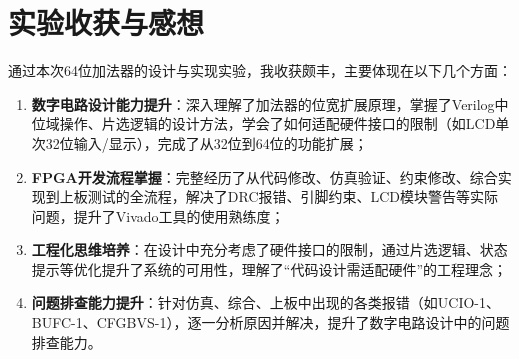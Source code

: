 \documentclass[12pt,a4paper,UTF8]{ctexart}
\begin{document}
\section{实验收获与感想}
通过本次64位加法器的设计与实现实验，我收获颇丰，主要体现在以下几个方面：
\begin{enumerate}[label=\arabic*.]
    \item \textbf{数字电路设计能力提升}：深入理解了加法器的位宽扩展原理，掌握了Verilog中位域操作、片选逻辑的设计方法，学会了如何适配硬件接口的限制（如LCD单次32位输入/显示），完成了从32位到64位的功能扩展；
    \item \textbf{FPGA开发流程掌握}：完整经历了从代码修改、仿真验证、约束修改、综合实现到上板测试的全流程，解决了DRC报错、引脚约束、LCD模块警告等实际问题，提升了Vivado工具的使用熟练度；
    \item \textbf{工程化思维培养}：在设计中充分考虑了硬件接口的限制，通过片选逻辑、状态提示等优化提升了系统的可用性，理解了“代码设计需适配硬件”的工程理念；
    \item \textbf{问题排查能力提升}：针对仿真、综合、上板中出现的各类报错（如UCIO-1、BUFC-1、CFGBVS-1），逐一分析原因并解决，提升了数字电路设计中的问题排查能力。
\end{enumerate}
\end{document}
